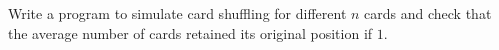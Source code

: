   Write a program to simulate card shuffling for different $n$ cards
  and check that the
  average number of cards retained its original position if $1$.
